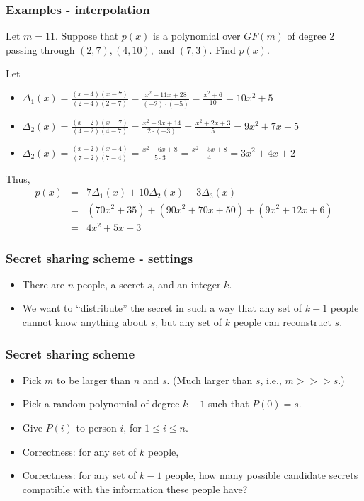 \begin{frame}
  \frametitle{Examples - interpolation}

  Let $m=11$. Suppose that $p(x)$ is a polynomial over $GF(m)$ of
  degree $2$ passing through $(2,7),(4,10),$ and $(7,3)$.  Find $p(x)$.

  \pause
  Let
  \begin{itemize}
  \item \pause
    $\Delta_1(x)=\frac{(x-4)(x-7)}{(2-4)(2-7)}
    =\frac{x^2-11x+28}{(-2)\cdot(-5)}
    =\frac{x^2+6}{10}
    =10x^2+5$
  \item \pause
    $\Delta_2(x)=\frac{(x-2)(x-7)}{(4-2)(4-7)}
    =\frac{x^2-9x+14}{2\cdot(-3)}
    =\frac{x^2+2x+3}{5}
    =9x^2+7x+5$
  \item \pause
    $\Delta_2(x)=\frac{(x-2)(x-4)}{(7-2)(7-4)}
    =\frac{x^2-6x+8}{5\cdot 3}
    =\frac{x^2+5x+8}{4}
    =3x^2+4x+2$
  \end{itemize}

  Thus,
  \begin{eqnarray*}
    p(x) &=&  7\Delta_1(x) + 10\Delta_2(x) + 3\Delta_3(x) \\
    &=& (70x^2 + 35) + (90x^2 + 70x+50) + (9x^2+12x+6) \\
    &=& 4x^2+5x+3
  \end{eqnarray*}
\end{frame}

\begin{frame}
  \frametitle{Secret sharing scheme - settings}
  \pause
  \begin{itemize}
  \item There are $n$ people, a secret $s$, and an integer $k$.
  \item We want to ``distribute'' the secret in such a way that any
    set of $k-1$ people cannot know anything about $s$, but any set of
    $k$ people can reconstruct $s$.
  \end{itemize}
\end{frame}

\begin{frame}
  \frametitle{Secret sharing scheme}
  \pause
  \begin{itemize}
  \item Pick $m$ to be larger than $n$ and $s$. (Much larger than $s$,
    i.e., $m >>> s$.)
  \item Pick a random polynomial of degree $k-1$ such that $P(0)=s$.
  \item Give $P(i)$ to person $i$, for $1\leq i\leq n$.
  \item Correctness: for any set of $k$ people,
    \pause

  \item Correctness: for any set of $k-1$ people, how many possible
    candidate secrets compatible with the information these people
    have?
  \end{itemize}
\end{frame}

